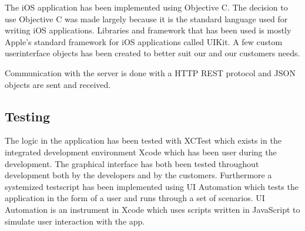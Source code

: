 The iOS application has been implemented using Objective C. The decision to use Objective C was made largely because it is the standard language used for writing iOS applications. Libraries and framework that has been used is mostly Apple's standard framework for iOS applications called UIKit. A few custom userinterface objects has been created to better suit our and our customers needs. 

Communication with the server is done with a HTTP REST protocol and JSON objects are sent and received. 

\subsection{Testing}
The logic in the application has been tested with XCTest which exists in the integrated development environment Xcode which has been user during the development. 
The graphical interface has both been tested throughout development both by the developers and by the customers. Furthermore a systemized testscript has been implemented using UI Automation which tests the application in the form of a user and runs through a set of scenarios. UI Automation is an instrument in Xcode which uses scripts written in JavaScript to simulate user interaction with the app.
